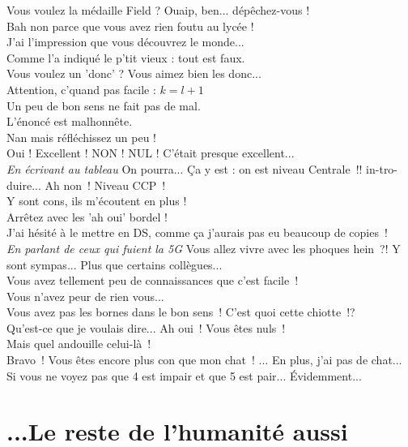 \documentclass[french, a4paper, openany]{book}
\begin{document}
	\noindent \og Vous voulez la médaille Field ? Ouaip, ben... dépêchez-vous ! \fg \\
	\og Bah non parce que vous avez rien foutu au lycée ! \fg \\
	\og J'ai l'impression que vous découvrez le monde... \fg \\
	\og Comme l'a indiqué le p'tit vieux : tout est faux. \fg \\
	\og Vous voulez un 'donc' ? Vous aimez bien les donc... \fg \\
	\og Attention, c'quand pas facile : $k = l+ 1$ \fg \\
	\og Un peu de bon sens ne fait pas de mal. \fg \\
	\og L'énoncé est malhonnête. \fg \\
	\og Nan mais réfléchissez un peu ! \fg \\
	\og Oui ! Excellent ! NON ! NUL ! C'était presque excellent... \fg \\
	\emph{En écrivant au tableau} \og On pourra... Ça y est : on est niveau Centrale~!! in-tro-duire... Ah non~! Niveau CCP~! \fg \\
	\og Y sont cons, ils m'écoutent en plus ! \fg \\
	\og Arrêtez avec les 'ah oui' bordel ! \fg \\
	\og J'ai hésité à le mettre en DS, comme ça j'aurais pas eu beaucoup de copies~!\fg \\
	\emph{En parlant de ceux qui fuient la 5G} \og Vous allez vivre avec les phoques hein~?! Y sont sympas... Plus que certains collègues... \fg \\
	\og Vous avez tellement peu de connaissances que c'est facile~! \fg \\
	\og Vous n'avez peur de rien vous... \fg \\	
	\og Vous avez pas les bornes dans le bon sens~! C'est quoi cette chiotte~!? \fg \\
	\og Qu'est-ce que je voulais dire... Ah oui~! Vous êtes nuls~! \fg \\
	\og Mais quel andouille celui-là~! \fg \\
	\og Bravo~! Vous êtes encore plus con que mon chat~! ... En plus, j'ai pas de chat... \fg \\
	\og Si vous ne voyez pas que 4 est impair et que 5 est pair... Évidemment... \fg \\
	
\chapter{...Le reste de l'humanité aussi}
\end{document}
